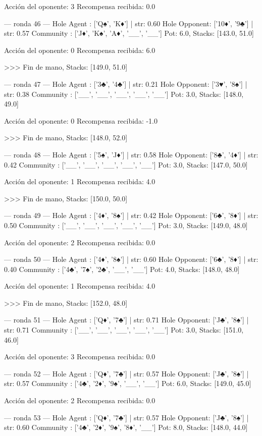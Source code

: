 Acción del oponente: 3
Recompensa recibida: 0.0

--- ronda 46 ---
Hole Agent : ['Q♠', 'K♦'] | str: 0.60
Hole Opponent: ['10♦', '9♣'] | str: 0.57
Community  : ['J♦', 'K♠', 'A♦', '__', '__']
Pot: 6.0, Stacks: [143.0, 51.0]

Acción del oponente: 0
Recompensa recibida: 6.0

>>> Fin de mano, Stacks: [149.0, 51.0]


--- ronda 47 ---
Hole Agent : ['3♣', '4♣'] | str: 0.21
Hole Opponent: ['3♥', '8♠'] | str: 0.38
Community  : ['__', '__', '__', '__', '__']
Pot: 3.0, Stacks: [148.0, 49.0]

Acción del oponente: 0
Recompensa recibida: -1.0

>>> Fin de mano, Stacks: [148.0, 52.0]


--- ronda 48 ---
Hole Agent : ['5♠', 'J♦'] | str: 0.58
Hole Opponent: ['8♣', '4♦'] | str: 0.42
Community  : ['__', '__', '__', '__', '__']
Pot: 3.0, Stacks: [147.0, 50.0]

Acción del oponente: 1
Recompensa recibida: 4.0

>>> Fin de mano, Stacks: [150.0, 50.0]


--- ronda 49 ---
Hole Agent : ['4♦', '8♠'] | str: 0.42
Hole Opponent: ['6♣', '8♦'] | str: 0.50
Community  : ['__', '__', '__', '__', '__']
Pot: 3.0, Stacks: [149.0, 48.0]

Acción del oponente: 2
Recompensa recibida: 0.0

--- ronda 50 ---
Hole Agent : ['4♦', '8♠'] | str: 0.60
Hole Opponent: ['6♣', '8♦'] | str: 0.40
Community  : ['4♣', '7♠', '2♣', '__', '__']
Pot: 4.0, Stacks: [148.0, 48.0]

Acción del oponente: 1
Recompensa recibida: 4.0

>>> Fin de mano, Stacks: [152.0, 48.0]


--- ronda 51 ---
Hole Agent : ['Q♦', '7♣'] | str: 0.71
Hole Opponent: ['J♣', '8♠'] | str: 0.71
Community  : ['__', '__', '__', '__', '__']
Pot: 3.0, Stacks: [151.0, 46.0]

Acción del oponente: 3
Recompensa recibida: 0.0

--- ronda 52 ---
Hole Agent : ['Q♦', '7♣'] | str: 0.57
Hole Opponent: ['J♣', '8♠'] | str: 0.57
Community  : ['4♣', '2♦', '9♠', '__', '__']
Pot: 6.0, Stacks: [149.0, 45.0]

Acción del oponente: 2
Recompensa recibida: 0.0

--- ronda 53 ---
Hole Agent : ['Q♦', '7♣'] | str: 0.57
Hole Opponent: ['J♣', '8♠'] | str: 0.60
Community  : ['4♣', '2♦', '9♠', '8♦', '__']
Pot: 8.0, Stacks: [148.0, 44.0]

